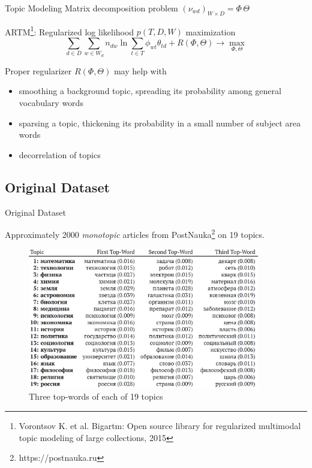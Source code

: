 \documentclass[russian]{beamer}
\begin{document}
\begin{frame}{Topic Modeling}
  Matrix decomposition problem
  $(\nu_{wd})_{W \times D} = \Phi\, \Theta$
  
  \medskip
  
  ARTM\footnote[frame]{Vorontsov K. et al. Bigartm: Open source library for regularized multimodal topic modeling of large collections, 2015}: Regularized log likelihood $p(T, D, W)$ maximization
  \[
    \sum_{d \in D}\sum_{w \in W_d}n_{dw} \ln{\sum_{t \in T} \phi_{wt} \theta_{td}} + R(\Phi, \Theta) \to \max\limits_{\Phi, \Theta}
  \]
  
  \medskip
  
  Proper regularizer $R(\Phi, \Theta)$ may help with
  \begin{itemize}
  \item smoothing a background topic, spreading its probability among general vocabulary words
  \item sparsing a topic, thickening its probability in a small number of subject area words
  \item decorrelation of topics
  \end{itemize}
\end{frame}


\subsection{Original Dataset}


\begin{frame}{Original Dataset}

  {\small
    Approximately 2000 \emph{monotopic} articles from PostNauka\footnote[frame]{https://postnauka.ru} on 19 topics.
  }
  
  \begin{figure}[h]
    \centering
    \includegraphics[width=0.9\textwidth]{topwords.jpg}
    \caption*{Three top-words of each of 19 topics}
  \end{figure}
\end{frame}
\end{document}
